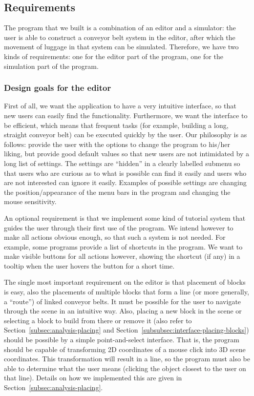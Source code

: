 \subsection{Requirements}
The program that we built is a combination of an editor and a simulator: the user is able to construct a conveyor belt system in the editor, after which the movement of luggage in that system can be simulated. Therefore, we have two kinds of requirements: one for the editor part of the program, one for the simulation part of the program.

\subsubsection{Design goals for the editor}
\label{subsubsec:design-goals-editor}
First of all, we want the application to have a very intuitive interface, so that new users can easily find the functionality. Furthermore, we want the interface to be efficient, which means that frequent tasks (for example, building a long, straight conveyor belt) can be executed quickly by the user. Our philosophy is as follows: provide the user with the options to change the program to his/her liking, but provide good default values so that new users are not intimidated by a long list of settings. The settings are ``hidden'' in a clearly labelled submenu so that users who are curious as to what is possible can find it easily and users who are not interested can ignore it easily. Examples of possible settings are changing the position/appearance of the menu bars in the program and changing the mouse sensitivity.

An optional requirement is that we implement some kind of tutorial system that guides the user through their first use of the program. We intend however to make all actions obvious enough, so that such a system is not needed. For example, some programs provide a list of shortcuts in the program. We want to make visible buttons for all actions however, showing the shortcut (if any) in a tooltip when the user hovers the button for a short time.

The single most important requirement on the editor is that placement of blocks is easy, also the placements of multiple blocks that form a line (or more generally, a ``route'') of linked conveyor belts. It must be possible for the user to navigate through the scene in an intuitive way. Also, placing a new block in the scene or selecting a block to build from there or remove it (also refer to Section~\ref{subsec:analysis-placing} and Section~\ref{subsubsec:interface-placing-blocks}) should be possible by a simple point-and-select interface. That is, the program should be capable of transforming 2D coordinates of a mouse click into 3D scene coordinates. This transformation will result in a line, so the program must also be able to determine what the user means (clicking the object closest to the user on that line). Details on how we implemented this are given in Section~\ref{subsec:analysis-placing}.

